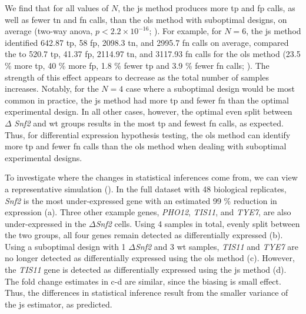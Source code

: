 We find that for all values of $N$, the \gls{js} method produces more \gls{tp} and \gls{fp} calls, as well as fewer \gls{tn} and \gls{fn} calls, than the \gls{ols} method with suboptimal designs, on average (two-way \gls{anova}, $p < 2.2 \times 10^{-16}$; ).
For example, for $N = 6$, the \gls{js} method identified 642.87 \gls{tp}, 58 \gls{fp}, 2098.3 \gls{tn}, and 2995.7 \gls{fn} calls on average, compared the to 520.7 \gls{tp}, 41.37 \gls{fp}, 2114.97 \gls{tn}, and 3117.93 \gls{fn} calls for the \gls{ols} method (23.5 \% more \gls{tp}, 40 \% more \gls{fp}, 1.8 \% fewer \gls{tp} and 3.9 \% fewer \gls{fn} calls; ).
The strength of this effect appears to decrease as the total number of samples increases.
Notably, for the $N = 4$ case where a suboptimal design would be most common in practice, the \gls{js} method had more \gls{tp} and fewer \gls{fn} than the optimal experimental design.
In all other cases, however, the optimal even split between $\Delta $ \emph{Snf2} and \gls{wt} groups results in the most \gls{tp} and fewest \gls{fn} calls, as expected.
Thus, for differential expression hypothesis testing, the \gls{ols} method can identify more \gls{tp} and fewer \gls{fn} calls than the \gls{ols} method when dealing with suboptimal experimental designs.


To investigate where the changes in statistical inferences come from, we can view a representative simulation ().
In the full dataset with 48 biological replicates, \emph{Snf2} is the most under-expressed gene with an estimated 99 \% reduction in expression (a).
Three other example genes, \emph{PHO12}, \emph{TIS11}, and \emph{TYE7}, are also under-expressed in the $\Delta$\emph{Snf2} cells.
Using 4 samples in total, evenly split between the two groups, all four genes remain detected as differentially expressed (b).
Using a suboptimal design with 1 $\Delta$\emph{Snf2} and 3 \gls{wt} samples, \emph{TIS11} and \emph{TYE7} are no longer detected as differentially expressed using the \gls{ols} method (c).
However, the \emph{TIS11} gene is detected as differentially expressed using the \gls{js} method (d).
The fold change estimates in c-d are similar, since the biasing is small effect.
Thus, the differences in statistical inference result from the smaller variance of the \gls{js} estimator, as predicted.

